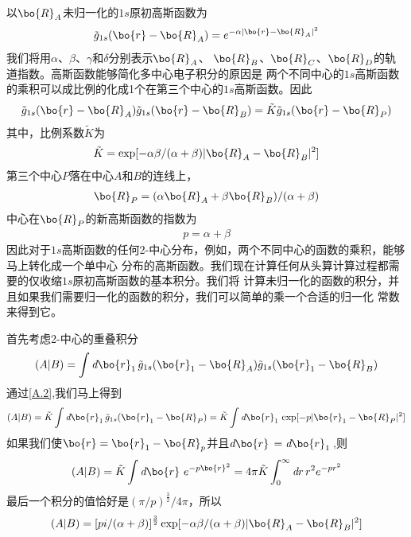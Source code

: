 以$\bo{R}_A$未归一化的$1s$原初高斯函数为
\begin{align}
	\label{A.1}
	\tilde{g}_{1s}(\bo{r}-\bo{R}_A)=e^{-\alpha\lvert \bo{r}-\bo{R}_A \rvert ^2}
\end{align}
我们将用$\alpha$、$\beta$、$\gamma$和$\delta$分别表示$\bo{R}_A$、
$\bo{R}_B$、$\bo{R}_C$、$\bo{R}_D$的轨道指数。高斯函数能够简化多中心电子积分的原因是
两个不同中心的$1s$高斯函数的乘积可以成比例的化成1个在第三个中心的$1s$高斯函数。因此
\begin{align}
	\label{A.2}
	\tilde{g}_{1s}(\bo{r}-\bo{R}_A)\tilde{g}_{1s}(\bo{r}-\bo{R}_B)
	=\tilde{K}\tilde{g}_{1s}(\bo{r}-\bo{R}_P)
\end{align}
其中，比例系数$\tilde{K}$为
\begin{align}
	\label{A.3}
    \tilde{K}=\exp[-\alpha\beta/(\alpha+\beta)\lvert \bo{R}_A-\bo{R}_B \rvert ^2]
\end{align}
第三个中心$P$落在中心$A$和$B$的连线上，
\begin{align}
	\label{A.4}
	\bo{R}_P=(\alpha\bo{R}_A+\beta \bo{R}_B)/(\alpha+\beta)
\end{align}
中心在$\bo{R}_P$的新高斯函数的指数为
\begin{align}
	\label{A.5}
	p=\alpha+\beta
\end{align}
因此对于$1s$高斯函数的任何2-中心分布，例如，两个不同中心的函数的乘积，能够马上转化成一个单中心
分布的高斯函数。我们现在计算任何从头算计算过程都需要的仅收缩$1s$原初高斯函数的基本积分。我们将
计算未归一化的函数的积分，并且如果我们需要归一化的函数的积分，我们可以简单的乘一个合适的归一化
常数来得到它。

首先考虑2-中心的重叠积分
\begin{align}
	\label{A.6}
	(A|B)=\int \emph{d}\bo{r}_1\,\tilde{g}_{1s}(\bo{r}_1-\bo{R}_A)\tilde{g}_{1s}(\bo{r}_1-\bo{R}_B)
\end{align}
通过\autoref{A.2},我们马上得到
\begin{align}
	\label{A.7}
	(A|B)=\tilde{K}\int \emph{d}\bo{r}_1\,\tilde{g}_{1s}(\bo{r}_1-\bo{R}_P)
	=\tilde{K}\int \emph{d}\bo{r}_1\, \exp[-p\lvert \bo{r}_1-\bo{R}_P \rvert ^2]
\end{align}
如果我们使$\bo{r}=\bo{r}_1-\bo{R}_p$并且$\emph{d}\bo{r}\,=\emph{d}\bo{r}_1\,$,则
\begin{align}
	\label{A.8}
	(A|B)=\tilde{K}\int \emph{d}\bo{r}\,\,e^{-p\bo{r}^2}=4\pi\tilde{K}\int_0^{\infty} \emph{d}r\,r^2e^{-pr^2}
\end{align}
最后一个积分的值恰好是$(\pi/p)^{\frac{3}{2}}/{4\pi}$，所以
\begin{align}
	\label{A.9}
	(A|B)=[pi/(\alpha+\beta)]^{\frac{3}{2}}\exp[-\alpha\beta/(\alpha+\beta)\lvert \bo{R}_A-\bo{R}_B \rvert ^2]
\end{align}

